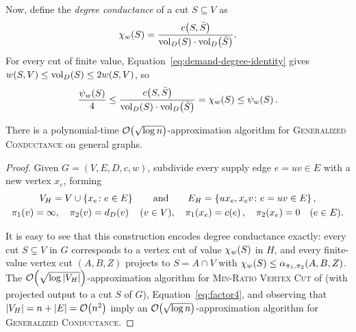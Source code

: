 Now, define the \emph{degree conductance} of a cut $S\subseteq V$ as
\[
  \chi_{w}\mathopen{}\left( S \right)
  =\frac{c\mathopen{}\left( S,\bar{S} \right)}{\operatorname{vol}_D\mathopen{}\left( S \right)\cdot \operatorname{vol}_D\mathopen{}\left( \bar{S} \right)}.
\]
For every cut of finite value, Equation~\eqref{eq:demand-degree-identity} gives $
  w\mathopen{}\left( S,V \right)\leq \operatorname{vol}_D\mathopen{}\left( S \right)\leq 2w\mathopen{}\left( S,V \right)$, so
\begin{equation} \label{eq:factor4}
  \frac{\psi_{w}\mathopen{}\left( S \right)}{4}\leq
  \frac{c\mathopen{}\left( S,\bar{S} \right)}{\operatorname{vol}_D\mathopen{}\left( S \right)\cdot \operatorname{vol}_D\mathopen{}\left( \bar{S} \right)}=\chi_{w}\mathopen{}\left( S \right)\leq
  \psi_{w}\mathopen{}\left( S \right).
\end{equation}

\begin{theorem}\label{thm:generalized-conductance-approx}
  There is a polynomial-time $\mathcal{O}\mathopen{}\left( \sqrt{\log n} \right)$-approximation algorithm for \textsc{Generalized Conductance} on general graphs.
\end{theorem}
\begin{proof}
  Given $G=(V,E,D,c,w)$, subdivide every supply edge $e=uv\in E$ with a new vertex $x_e$, forming
  \[
    \begin{gathered}
      V_H=V\cup\mathopen{}\left\{ x_e\colon e\in E \right\}
      \qquad\text{and}\qquad
      E_H=\mathopen{}\left\{ ux_e,x_ev\colon e=uv\in E \right\},\\
      \pi_1\mathopen{}\left( v \right)=\infty,\quad \pi_2\mathopen{}\left( v \right)=d_D\mathopen{}\left( v \right)\quad(v\in V),\quad
      \pi_1\mathopen{}\left( x_e \right)=c\mathopen{}\left( e \right),\quad \pi_2\mathopen{}\left( x_e \right)=0\quad(e\in E).
    \end{gathered}
  \]

  It is easy to see that this construction encodes degree conductance exactly: every cut $S\subsetneq V$ in $G$ corresponds to a vertex cut of value $\chi_{w}\mathopen{}\left( S \right)$ in $H$, and every finite-value vertex cut $(A,B,Z)$ projects to $S=A\cap V$ with $\chi_{w}\mathopen{}\left( S \right)\leq\alpha_{\pi_1,\pi_2}\mathopen{}\left( A,B,Z \right)$.
  The $\mathcal{O}\mathopen{}\left( \sqrt{\log |V_H|} \right)$-approximation algorithm for \textsc{Min-Ratio Vertex Cut} of \cite{ImprovedApproximationAlgorithmsForMinimumWeightVertexSeparators} (with projected output to a cut $S$ of $G$), Equation~\eqref{eq:factor4}, and observing that $|V_H|=n+|E|=\mathcal{O}\mathopen{}\left( n^2 \right)$ imply an $\mathcal{O}\mathopen{}\left( \sqrt{\log n} \right)$-approximation algorithm for \textsc{Generalized Conductance}.
\end{proof}
